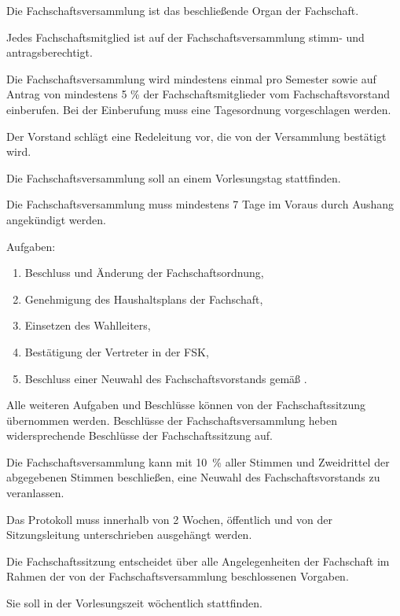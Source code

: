 \documentclass[a4paper,parskip=half,numbers=noenddot]{scrartcl}
\begin{document}
\begin{contract}
Die Fachschaftsversammlung ist das beschließende Organ der Fachschaft.

Jedes Fachschaftsmitglied ist auf der Fachschaftsversammlung stimm- und antragsberechtigt.

Die Fachschaftsversammlung wird mindestens einmal pro Semester sowie auf Antrag von mindestens 5 \% der Fachschaftsmitglieder vom Fachschaftsvorstand einberufen. Bei der Einberufung muss eine Tagesordnung vorgeschlagen werden.

Der Vorstand schlägt eine Redeleitung vor, die von der Versammlung bestätigt wird.

Die Fachschaftsversammlung soll an einem Vorlesungstag stattfinden. 

Die Fachschaftsversammlung muss mindestens 7 Tage im Voraus durch Aushang angekündigt werden.

Aufgaben: \label{fachschaft:vv:kompetenzen}
  \begin{enumerate}
  \item Beschluss und Änderung der Fachschaftsordnung,
  \item Genehmigung des Haushaltsplans der Fachschaft, 
  \item Einsetzen des Wahlleiters, \label{fachschaft:vv:wahlleiter}
  \item Bestätigung der Vertreter in der FSK,
  \item Beschluss einer Neuwahl des Fachschaftsvorstands gemäß . \label{fachschaft:vv:kompetenzen:abwahl}
 
  \end{enumerate}

Alle weiteren Aufgaben und Beschlüsse können von der Fachschaftssitzung übernommen werden. Beschlüsse der Fachschaftsversammlung heben widersprechende Beschlüsse der Fachschaftssitzung auf.

Die Fachschaftsversammlung kann mit 10~\% aller Stimmen und Zweidrittel der abgegebenen Stimmen be\-schlie\-ßen, eine Neuwahl des Fach\-schaftsvor\-stands zu veranlassen\label{fachschaft:vv:wahl}.

Das Protokoll muss innerhalb von 2 Wochen, öffentlich und von der Sitzungsleitung unterschrieben ausgehängt werden. 

\label{fs:sitzung}

Die Fachschaftssitzung entscheidet über alle Angelegenheiten der Fachschaft im Rahmen der von der Fachschaftsversammlung beschlossenen Vorgaben. 

Sie soll in der Vorlesungszeit wöchentlich stattfinden.


\end{contract}
\end{document}
